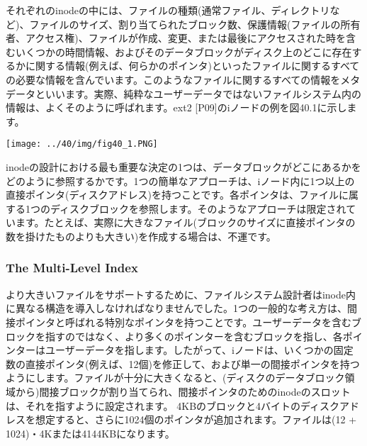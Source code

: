 それぞれのinodeの中には、ファイルの種類(通常ファイル、ディレクトリなど)、ファイルのサイズ、割り当てられたブロック数、保護情報(ファイルの所有者、アクセス権)、ファイルが作成、変更、または最後にアクセスされた時を含むいくつかの時間情報、およびそのデータブロックがディスク上のどこに存在するかに関する情報(例えば、何らかのポインタ)といったファイルに関するすべての必要な情報を含んでいます。このようなファイルに関するすべての情報をメタデータといいます。実際、純粋なユーザーデータではないファイルシステム内の情報は、よくそのように呼ばれます。ext2
{[}P09{]}のiノードの例を図40.1に示します。

\texttt{[image: ../40/img/fig40\_1.PNG]}

inodeの設計における最も重要な決定の1つは、データブロックがどこにあるかをどのように参照するかです。1つの簡単なアプローチは、iノード内に1つ以上の直接ポインタ(ディスクアドレス)を持つことです。各ポインタは、ファイルに属する1つのディスクブロックを参照します。そのようなアプローチは限定されています。たとえば、実際に大きなファイル(ブロックのサイズに直接ポインタの数を掛けたものよりも大きい)を作成する場合は、不運です。

\hypertarget{the-multi-level-index}{%
\subsubsection*{The Multi-Level Index}\label{the-multi-level-index}}

より大きいファイルをサポートするために、ファイルシステム設計者はinode内に異なる構造を導入しなければなりませんでした。1つの一般的な考え方は、間接ポインタと呼ばれる特別なポインタを持つことです。ユーザーデータを含むブロックを指すのではなく、より多くのポインターを含むブロックを指し、各ポインターはユーザーデータを指します。したがって、iノードは、いくつかの固定数の直接ポインタ(例えば、12個)を修正して、および単一の間接ポインタを持つようにします。ファイルが十分に大きくなると、(ディスクのデータブロック領域から)間接ブロックが割り当てられ、間接ポインタのためのinodeのスロットは、それを指すように設定されます。
4KBのブロックと4バイトのディスクアドレスを想定すると、さらに1024個のポインタが追加されます。ファイルは(12
+ 1024)・4Kまたは4144KBになります。


